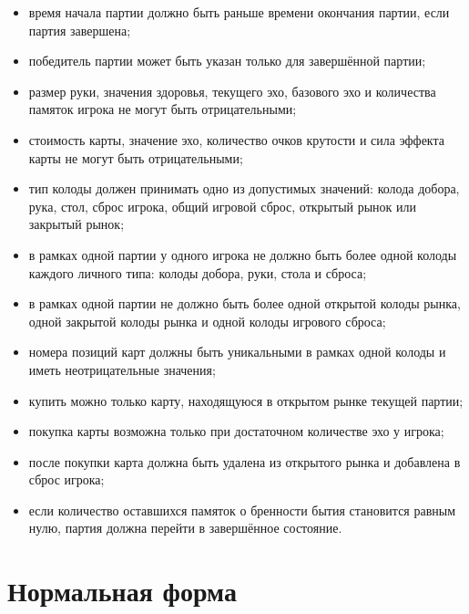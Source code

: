\begin{itemize}

    \item время начала партии должно быть раньше времени окончания партии, если партия завершена;

    \item победитель партии может быть указан только для завершённой партии;

    \item размер руки, значения здоровья, текущего эхо, базового эхо и количества памяток игрока не могут быть отрицательными;

    \item стоимость карты, значение эхо, количество очков крутости и сила эффекта карты не могут быть отрицательными;

    \item тип колоды должен принимать одно из допустимых значений: колода добора, рука, стол, сброс игрока, общий игровой сброс, открытый рынок или закрытый рынок;

    \item в рамках одной партии у одного игрока не должно быть более одной колоды каждого личного типа: колоды добора, руки, стола и сброса;

    \item в рамках одной партии не должно быть более одной открытой колоды рынка, одной закрытой колоды рынка и одной колоды игрового сброса;

    \item номера позиций карт должны быть уникальными в рамках одной колоды и иметь неотрицательные значения;

    \item купить можно только карту, находящуюся в открытом рынке текущей партии;

    \item покупка карты возможна только при достаточном количестве эхо у игрока;

    \item после покупки карта должна быть удалена из открытого рынка и добавлена в сброс игрока;

    \item если количество оставшихся памяток о бренности бытия становится равным нулю, партия должна перейти в завершённое состояние.

\end{itemize}
\section{Нормальная форма}

